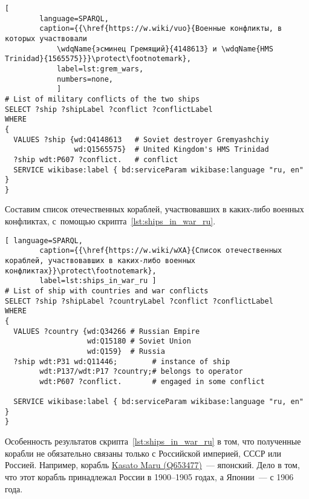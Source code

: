 \begin{lstlisting}[ 
        language=SPARQL, 
        caption={{\href{https://w.wiki/vuo}{Военные конфликты, в которых участвовали 
            \wdqName{эсминец Гремящий}{4148613} и \wdqName{HMS Trinidad}{1565575}}}\protect\footnotemark}, 
            label=lst:grem_wars, 
            numbers=none,
            ]
# List of military conflicts of the two ships 
SELECT ?ship ?shipLabel ?conflict ?conflictLabel
WHERE
{
  VALUES ?ship {wd:Q4148613   # Soviet destroyer Gremyashchiy
                wd:Q1565575}  # United Kingdom's HMS Trinidad
  ?ship wdt:P607 ?conflict.   # conflict
  SERVICE wikibase:label { bd:serviceParam wikibase:language "ru, en" }
}
\end{lstlisting}




\newpage
Составим список отечественных кораблей, 
участвовавших в каких-либо военных конфликтах, 
с~помощью скрипта~\ref{lst:ships_in_war_ru}.

\begin{lstlisting}[ language=SPARQL, 
        caption={{\href{https://w.wiki/wXA}{Список отечественных кораблей, участвовавших в каких-либо военных конфликтах}}\protect\footnotemark}, 
        label=lst:ships_in_war_ru ]
# List of ship with countries and war conflicts
SELECT ?ship ?shipLabel ?countryLabel ?conflict ?conflictLabel
WHERE
{
  VALUES ?country {wd:Q34266 # Russian Empire
                   wd:Q15180 # Soviet Union
                   wd:Q159}  # Russia
  ?ship wdt:P31 wd:Q11446;        # instance of ship
        wdt:P137/wdt:P17 ?country;# belongs to operator
        wdt:P607 ?conflict.       # engaged in some conflict

  SERVICE wikibase:label { bd:serviceParam wikibase:language "ru, en" }
}
\end{lstlisting}

Особенность результатов скрипта~\ref{lst:ships_in_war_ru} в том, 
что полученные корабли не обязательно связаны только с Российской империей, 
СССР или Россией. 
Например, корабль \href{https://www.wikidata.org/wiki/Q653477}{Kasato Maru (Q653477)}~--- японский. 
Дело в том, что этот корабль принадлежал России в 1900--1905 годах, а Японии~--- с 1906 года.


